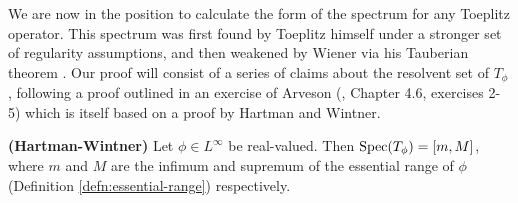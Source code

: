\documentclass[../main.tex]{subfiles}
\begin{document}
We are now in the position to calculate the form of the spectrum for any
Toeplitz operator. This spectrum was first found by Toeplitz himself under a
stronger set of regularity assumptions, and then weakened by Wiener via his
Tauberian theorem \parencite{schmidt1960toeplitz}.
Our proof will consist of a series of claims about the resolvent set of
$T_\phi$, following a proof outlined in an exercise of Arveson
(\parencite{arveson2002short}, Chapter 4.6, exercises 2-5) which is itself based
on a proof by Hartman and Wintner.

\begin{theorem}{\textbf{(Hartman-Wintner)}}\label{thm:hartman-wintner}
Let $\phi \in L^\infty$ be real-valued. Then $\mathrm{Spec}(T_\phi) = [m, M]$, where $m$
and $M$ are the infimum and supremum of the essential range of $\phi$
(Definition \ref{defn:essential-range}) respectively. \end{theorem}
\end{document}
